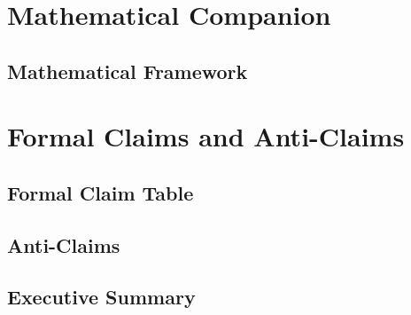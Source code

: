 \part{Mathematical Companion}


\chapter{Mathematical Framework}


\part{Formal Claims and Anti-Claims}

\chapter{Formal Claim Table}



\chapter{Anti-Claims}




\chapter{Executive Summary}


